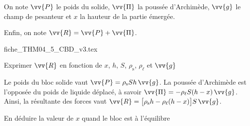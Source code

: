 \smallskip

On note $\vv{P}$ le poids du solide, $\vv{\Pi}$ la poussée d'Archimède, $\vv{g}$ le champ de pesanteur et $x$ la hauteur de la partie émergée.

Enfin, on note $\vv{R}=\vv{P}+\vv{\Pi}$.

                                \initialisationPartieDroite %
\def\ratioScaleImage{1.2}
\begin{center}
{fiche_THM04_5_CBD_v3.tex}
\end{center}
                               \finalisationDuPartageDePage %

\debutEntrainement


\begin{enonce}
Exprimer $\vv{R}$ en fonction de $x$, $h$, $S$, $\rho_\text{s}$, $\rho_\ell$ et $\vv{g}$
\end{enonce}


\begin{corrige}
Le poids du bloc solide vaut $\vv{P}=\rho_\text{s}Sh\, \vv{g}$. La poussée d'Archimède est l'opposée du poids de liquide déplacé, à savoir $\vv{\Pi}=-\rho_\ell S(h-x)\, \vv{g}$. Ainsi, la résultante des forces vaut $\vv{R}=\big[\rho_\text{s}h-\rho_\ell (h-x)\big]S\,\vv{g}$.
\end{corrige}

\begin{enonce}
En déduire la valeur de $x$ quand le bloc est à l'équilibre
\end{enonce}

